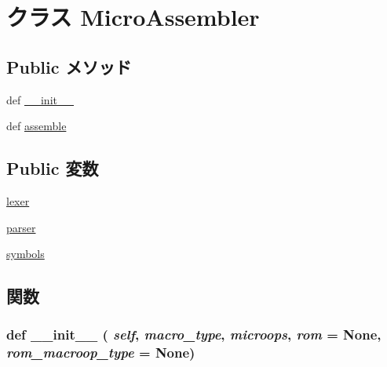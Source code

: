 \hypertarget{classmicro__asm_1_1MicroAssembler}{
\section{クラス MicroAssembler}
\label{classmicro__asm_1_1MicroAssembler}
}
\subsection*{Public メソッド}
\begin{DoxyCompactItemize}
\item 
def \hyperlink{classmicro__asm_1_1MicroAssembler_ac775ee34451fdfa742b318538164070e}{\_\-\_\-init\_\-\_\-}
\item 
def \hyperlink{classmicro__asm_1_1MicroAssembler_a141856bf71e916a2ab3ae8eec041443a}{assemble}
\end{DoxyCompactItemize}
\subsection*{Public 変数}
\begin{DoxyCompactItemize}
\item 
\hyperlink{classmicro__asm_1_1MicroAssembler_a85c2cf2af397cfa9814ed9d65b58dc11}{lexer}
\item 
\hyperlink{classmicro__asm_1_1MicroAssembler_a90eee7a4677ca8b1ed116364a24367f9}{parser}
\item 
\hyperlink{classmicro__asm_1_1MicroAssembler_a591fb19f856c8faff2c302734ad80cc0}{symbols}
\end{DoxyCompactItemize}


\subsection{関数}
\hypertarget{classmicro__asm_1_1MicroAssembler_ac775ee34451fdfa742b318538164070e}{
\subsubsection[{\_\-\_\-init\_\-\_\-}]{\setlength{\rightskip}{0pt plus 5cm}def \_\-\_\-init\_\-\_\- ( {\em self}, \/   {\em macro\_\-type}, \/   {\em microops}, \/   {\em rom} = {\ttfamily None}, \/   {\em rom\_\-macroop\_\-type} = {\ttfamily None})}}
\label{classmicro__asm_1_1MicroAssembler_ac775ee34451fdfa742b318538164070e}



